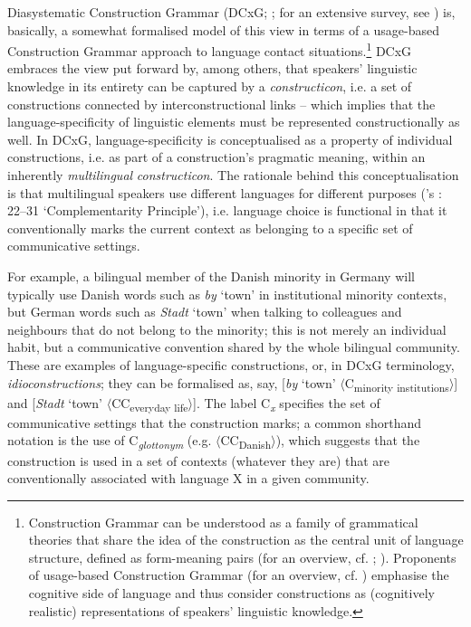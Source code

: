 \documentclass[output=paper]{langsci/langscibook}
\begin{document}
Diasystematic Construction Grammar (DCxG; \citealt{Hoder.2012, Hoder.2014, Hoder.2018, Hoder.2019b}; for an extensive survey, see \citealt{Hoder.2018}) is, basically, a somewhat formalised model of this view in terms of a usage-based Construction Grammar approach to language contact situations.\footnote{Construction Grammar can be understood as a family of grammatical theories that share the idea of the construction as the central unit of language structure, defined as form-meaning pairs (for an overview, cf. \citealt{Hoffmann.2013}; \citealt{Hilpert.2019}). Proponents of usage-based Construction Grammar (for an overview, cf. \citealt{Diessel.2019}) emphasise the cognitive side of language and thus consider constructions as (cognitively realistic) representations of speakers’ linguistic knowledge.} DCxG embraces the view put forward by, among others, \citet[18]{Goldberg.2006} that speakers’ linguistic knowledge in its entirety can be captured by a \textit{constructicon}, i.e. a set of constructions connected by interconstructional links – which implies that the language-specificity of linguistic elements must be represented constructionally as well. In DCxG, language-specificity is conceptualised as a property of individual constructions, i.e. as part of a construction’s pragmatic meaning, within an inherently \textit{multilingual} \textit{constructicon}. The rationale behind this conceptualisation is that multilingual speakers use different languages for different purposes (\citeauthor{Grosjean.2008}'s \citeyear{Grosjean.2008}: 22--31 ‘Complementarity Principle’), i.e. language choice is functional in that it conventionally marks the current context as belonging to a specific set of communicative settings.

For example, a bilingual member of the Danish minority in Germany will typically use Danish words such as \textit{by} ‘town’ in institutional minority contexts, but German words such as \textit{Stadt} ‘town’ when talking to colleagues and neighbours that do not belong to the minority; this is not merely an individual habit, but a communicative convention shared by the whole bilingual community. These are examples of language-specific constructions, or, in DCxG terminology, \textit{idioconstructions}; they can be formalised as, say, {[}\textit{by} ‘town’ $\langle$C\textsubscript{minority institutions}$\rangle${]} and {[}\textit{Stadt} ‘town’ $\langle$CC\textsubscript{everyday life}$\rangle${]}. The label C\textit{\textsubscript{x}} specifies the set of communicative settings that the construction marks; a common shorthand notation is the use of C\textit{\textsubscript{glottonym}} (e.g. $\langle$CC\textsubscript{Danish}$\rangle$), which suggests that the construction is used in a set of contexts (whatever they are) that are conventionally associated with language X in a given community.
\end{document}
